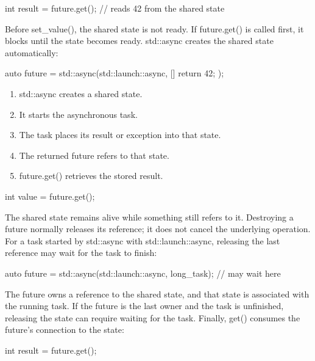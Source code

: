 \documentclass{report}
\begin{document}
\begin{itemize}
\begin{cppcode}
                int result = future.get(); // reads 42 from the shared state
            \end{cppcode}
            \bigbreak \noindent 
            Before set\_value(), the shared state is not ready. If future.get() is called first, it blocks until the state becomes ready.
            \bigbreak \noindent 
            std::async creates the shared state automatically:
            \bigbreak \noindent 
            \begin{cppcode}
                auto future = std::async(std::launch::async, [] {
                    return 42;
                });
            \end{cppcode}
            \begin{enumerate}
                \item std::async creates a shared state.
                \item It starts the asynchronous task.
                \item The task places its result or exception into that state.
                \item The returned future refers to that state.
                \item future.get() retrieves the stored result.
            \end{enumerate}
            \bigbreak \noindent 
            \begin{cppcode}
            int value = future.get();
            \end{cppcode}
            \bigbreak \noindent 
            The shared state remains alive while something still refers to it. Destroying a future normally releases its reference; it does not cancel the underlying operation.
            \bigbreak \noindent 
            For a task started by std::async with std::launch::async, releasing the last reference may wait for the task to finish:
            \bigbreak \noindent 
            \begin{cppcode}
                {
                    auto future = std::async(std::launch::async, long_task);
                } // may wait here
            \end{cppcode}
            \bigbreak \noindent 
            The future owns a reference to the shared state, and that state is associated with the running task. If the future is the last owner and the task is unfinished, releasing the state can require waiting for the task.
            \bigbreak \noindent 
            Finally, get() consumes the future’s connection to the state:
            \bigbreak \noindent 
            \begin{cppcode}
                int result = future.get();


\end{cppcode}
\end{itemize}
\end{document}

